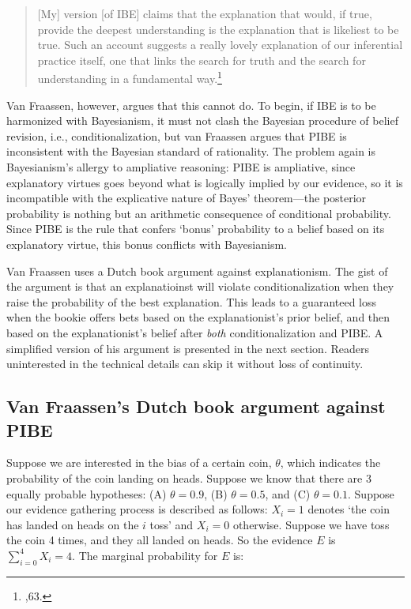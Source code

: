 \begin{quote}
{[}My{]} version {[}of IBE{]} claims that the explanation that would, if
true, provide the deepest understanding is the explanation that is
likeliest to be true. Such an account suggests a really lovely
explanation of our inferential practice itself, one that links the
search for truth and the search for understanding in a fundamental way.\footnote{\cite{lipton},63.}
\end{quote}

Van Fraassen, however, argues that this cannot do. To begin, if IBE is
to be harmonized with Bayesianism, it must not clash the Bayesian
procedure of belief revision, i.e., conditionalization, but van Fraassen
argues that PIBE is inconsistent with the Bayesian standard
of rationality. The problem again is Bayesianism's allergy to ampliative
reasoning: PIBE is ampliative, since explanatory virtues goes beyond
what is logically implied by our evidence, so it is incompatible with
the explicative nature of Bayes' theorem---the posterior
probability is nothing but an arithmetic consequence of conditional
probability. Since PIBE is the rule that confers
`bonus' probability to a belief based on its explanatory virtue, this bonus  conflicts with Bayesianism.

Van Fraassen uses a Dutch book argument against explanationism. The gist
of the argument is that an explanatioinst will violate
conditionalization when they raise the probability of the best
explanation. This leads to a guaranteed loss when the bookie offers bets
based on the explanationist's prior belief, and then based on the
explanationist's belief after \emph{both} conditionalization and PIBE. A
simplified version of his argument is presented in the next section.
Readers uninterested in the technical details can skip it without loss
of continuity.

\hypertarget{van-fraassens-dutch-book-argument-against-pibe}{%
\subsection{Van Fraassen's Dutch book argument against
PIBE}\label{van-fraassens-dutch-book-argument-against-pibe}}

Suppose we are interested in the bias of a certain coin, \(\theta\),
which indicates the probability of the coin landing on heads. Suppose we
know that there are 3 equally probable hypotheses: (A) \(\theta = 0.9\),
(B) \(\theta = 0.5\), and (C) \(\theta = 0.1\). Suppose our evidence
gathering process is described as follows: \(X_i = 1\) denotes `the coin
has landed on heads on the \(i\) toss' and \(X_i = 0\) otherwise.
Suppose we have toss the coin 4 times, and they all landed on heads. So
the evidence \(E\) is \(\sum_{i=0}^4 X_i = 4\). The marginal probability
for \(E\) is:

